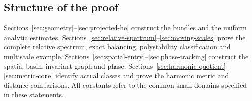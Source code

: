 \subsection{Structure of the proof}

Sections~\ref{sec:geometry}--\ref{sec:projected-he}
construct the bundles and the uniform analytic estimates.
Sections~\ref{sec:relative-spectrum}--\ref{sec:moving-scales}
prove the complete relative spectrum, exact balancing,
polystability classification and multiscale example.
Sections~\ref{sec:spatial-entry}--\ref{sec:phase-tracking}
construct the spatial basin, invariant graph and phase.
Sections~\ref{sec:harmonic-quotient}--\ref{sec:metric-cone}
identify actual classes and prove the harmonic metric
and distance comparisons. All constants refer to the
common small domains specified in these statements.
